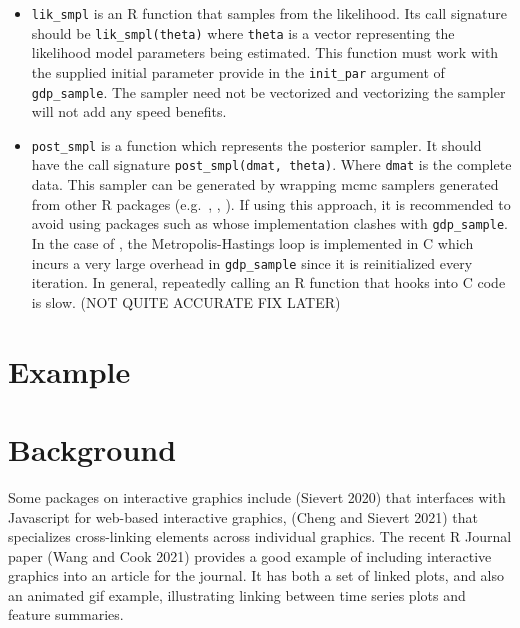 \begin{itemize}
\item
  \texttt{lik\_smpl} is an R function that samples from the likelihood. Its
  call signature should be \texttt{lik\_smpl(theta)} where \texttt{theta} is a vector
  representing the likelihood model parameters being estimated. This function
  must work with the supplied initial parameter provide in the \texttt{init\_par}
  argument of \texttt{gdp\_sample}. The sampler need not be vectorized and vectorizing
  the sampler will not add any speed benefits.
\item
  \texttt{post\_smpl} is a function which represents the posterior sampler. It should
  have the call signature \texttt{post\_smpl(dmat,\ theta)}. Where \texttt{dmat} is the
  complete data. This sampler can be generated by wrapping mcmc samplers generated from other R packages
  (e.g.~, , ).
  If using this approach, it is recommended to avoid using packages such as 
  whose implementation clashes with \texttt{gdp\_sample}. In the case of ,
  the Metropolis-Hastings loop is implemented in C which incurs a very large overhead
  in \texttt{gdp\_sample} since it is reinitialized every iteration. In general, repeatedly calling
  an R function that hooks into C code is slow. (NOT QUITE ACCURATE FIX LATER)
\end{itemize}

\hypertarget{example}{%
\section{Example}\label{example}}

\hypertarget{background}{%
\section{Background}\label{background}}

Some packages on interactive graphics include  (Sievert 2020) that interfaces with Javascript for web-based interactive graphics,  (Cheng and Sievert 2021) that specializes cross-linking elements across individual graphics. The recent R Journal paper  (Wang and Cook 2021) provides a good example of including interactive graphics into an article for the journal. It has both a set of linked plots, and also an animated gif example, illustrating linking between time series plots and feature summaries.

